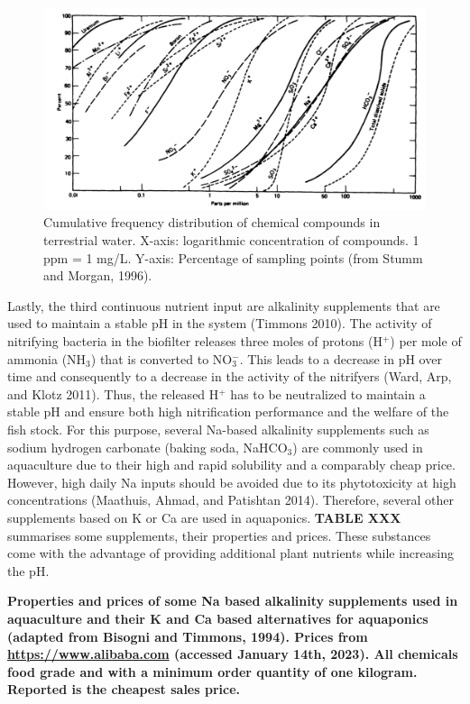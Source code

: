 \documentclass[
]{article}
\begin{document}
\begin{figure}
\centering
\includegraphics{images/Stumm_Morgan_Aquatic_Chemistry_p873.png}
\caption{Cumulative frequency distribution of chemical compounds in terrestrial water. X-axis: logarithmic concentration of compounds. 1 ppm = 1 mg/L. Y-axis: Percentage of sampling points (from Stumm and Morgan, 1996).}
\end{figure}

Lastly, the third continuous nutrient input are alkalinity supplements that are used to maintain a stable pH in the system (Timmons 2010). The activity of nitrifying bacteria in the biofilter releases three moles of protons (H\(^{+}\)) per mole of ammonia (NH\(_{3}\)) that is converted to NO\(_{3}^{-}\). This leads to a decrease in pH over time and consequently to a decrease in the activity of the nitrifyers (Ward, Arp, and Klotz 2011). Thus, the released H\(^{+}\) has to be neutralized to maintain a stable pH and ensure both high nitrification performance and the welfare of the fish stock. For this purpose, several Na-based alkalinity supplements such as sodium hydrogen carbonate (baking soda, NaHCO\(_{3}\)) are commonly used in aquaculture due to their high and rapid solubility and a comparably cheap price. However, high daily Na inputs should be avoided due to its phytotoxicity at high concentrations (Maathuis, Ahmad, and Patishtan 2014). Therefore, several other supplements based on K or Ca are used in aquaponics.
\textbf{TABLE XXX} summarises some supplements, their properties and prices. These substances come with the advantage of providing additional plant nutrients while increasing the pH.

\textbf{Properties and prices of some Na based alkalinity supplements used in aquaculture and their K and Ca based alternatives for aquaponics (adapted from Bisogni and Timmons, 1994). Prices from \url{https://www.alibaba.com} (accessed January 14th, 2023). All chemicals food grade and with a minimum order quantity of one kilogram. Reported is the cheapest sales price.}
\end{document}
